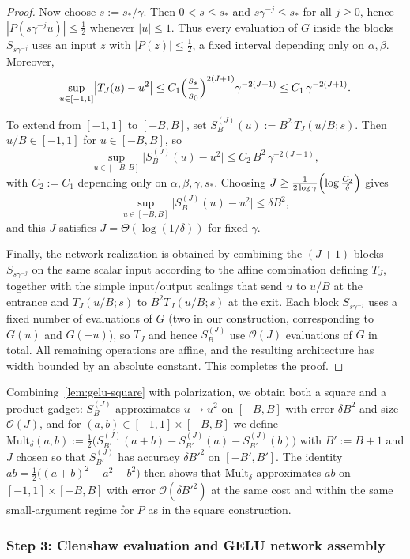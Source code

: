 \documentclass{article}
\theoremstyle{plain}
\theoremstyle{definition}
\theoremstyle{remark}
\begin{document}
\begin{proof}
Now choose $s:=s_*/\gamma$. Then $0<s\le s_*$ and $s\gamma^{-j}\le s_*$ for all $j\ge 0$, hence $|P(s\gamma^{-j}u)|\le \tfrac12$ whenever $|u|\le 1$. Thus every evaluation of $G$ inside the blocks $S_{s\gamma^{-j}}$ uses an input $z$ with $|P(z)|\le \tfrac12$, a fixed interval depending only on $\alpha,\beta$. Moreover,
\[
\sup_{u\in[-1,1]}\bigl|T_J(u)-u^2\bigr|
\le
C_1\Bigl(\frac{s_*}{s_0}\Bigr)^{2(J+1)}\gamma^{-2(J+1)}
\le
C_1\,\gamma^{-2(J+1)}.
\]

To extend from $[-1,1]$ to $[-B,B]$, set \( S_B^{(J)}(u) := B^2\,T_J(u/B;s).\) Then $u/B\in[-1,1]$ for $u\in[-B,B]$, so
\[
\sup_{u\in[-B,B]}\bigl|S_B^{(J)}(u)-u^2\bigr|
\le
C_2\,B^2\,\gamma^{-2(J+1)},
\]
with $C_2:=C_1$ depending only on $\alpha,\beta,\gamma,s_*$. Choosing \( J \ge \frac{1}{2\log\gamma}\Bigl(\log\frac{C_2}{\delta}\Bigr) \) gives
\[
\sup_{u\in[-B,B]}\bigl|S_B^{(J)}(u)-u^2\bigr|\le \delta B^2,
\]
and this $J$ satisfies $J=\Theta(\log(1/\delta))$ for fixed $\gamma$.

Finally, the network realization is obtained by combining the $(J+1)$ blocks $S_{s\gamma^{-j}}$ on the same scalar input according to the affine combination defining $T_J$, together with the simple input/output scalings that send $u$ to $u/B$ at the entrance and $T_J(u/B;s)$ to $B^2 T_J(u/B;s)$ at the exit. Each block $S_{s\gamma^{-j}}$ uses a fixed number of evaluations of $G$ (two in our construction, corresponding to $G(u)$ and $G(-u)$), so $T_J$ and hence $S_B^{(J)}$ use $\mathcal{O}(J)$ evaluations of $G$ in total. All remaining operations are affine, and the resulting architecture has width bounded by an absolute constant. This completes the proof.
\end{proof}

Combining~\cref{lem:gelu-square} with polarization, we obtain both a square and a product gadget: \(S_B^{(J)}\) approximates \(u\mapsto u^2\) on \([-B,B]\) with error \(\delta B^2\) and size \(\mathcal{O}(J)\), and for \((a,b)\in[-1,1]\times[-B,B]\) we define
\(\mathrm{Mult}_\delta(a,b):=\tfrac12\bigl(S^{(J)}_{B'}(a+b)-S^{(J)}_{B'}(a)-S^{(J)}_{B'}(b)\bigr)\) with \(B':=B+1\) and \(J\) chosen so that \(S^{(J)}_{B'}\) has accuracy \(\delta B'^2\) on \([-B',B']\). The identity \(ab=\tfrac12\bigl((a+b)^2-a^2-b^2\bigr)\) then shows that \(\mathrm{Mult}_\delta\) approximates \(ab\) on \([-1,1]\times[-B,B]\) with error \(\mathcal{O}(\delta B'^2)\) at the same cost and within the same small-argument regime for \(P\) as in the square construction.

\subsubsection*{Step 3: Clenshaw evaluation and GELU network assembly}
\end{document}
